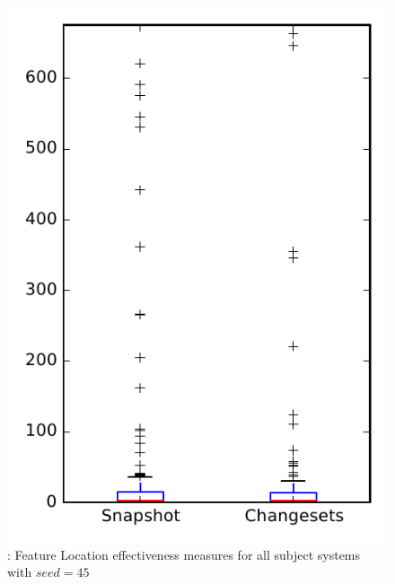 
\begin{figure}
\centering
\includegraphics[height=0.4\textheight]{figures/flt_seed/rq1_overview_45}
\caption{\rone: Feature Location effectiveness measures for all subject systems with $seed=45$}
\label{fig:flt_seed:rq1:overview}
\end{figure}
